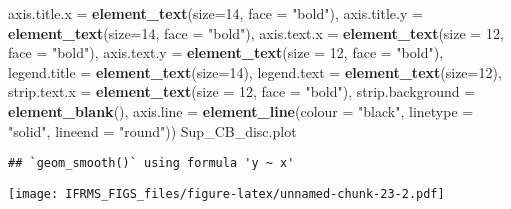 \documentclass[
]{article}
\newenvironment{Shaded}{\begin{snugshade}}{\end{snugshade}}
\newcommand{\DataTypeTok}[1]{\textcolor[rgb]{0.13,0.29,0.53}{#1}}
\newcommand{\DecValTok}[1]{\textcolor[rgb]{0.00,0.00,0.81}{#1}}
\newcommand{\KeywordTok}[1]{\textcolor[rgb]{0.13,0.29,0.53}{\textbf{#1}}}
\newcommand{\NormalTok}[1]{#1}
\newcommand{\StringTok}[1]{\textcolor[rgb]{0.31,0.60,0.02}{#1}}
\begin{document}
\begin{Shaded}
\begin{Highlighting}[]
         \DataTypeTok{axis.title.x =} \KeywordTok{element_text}\NormalTok{(}\DataTypeTok{size=}\DecValTok{14}\NormalTok{, }\DataTypeTok{face =} \StringTok{"bold"}\NormalTok{),}
         \DataTypeTok{axis.title.y =} \KeywordTok{element_text}\NormalTok{(}\DataTypeTok{size=}\DecValTok{14}\NormalTok{, }\DataTypeTok{face =} \StringTok{"bold"}\NormalTok{),}
         \DataTypeTok{axis.text.x =} \KeywordTok{element_text}\NormalTok{(}\DataTypeTok{size =} \DecValTok{12}\NormalTok{, }\DataTypeTok{face =} \StringTok{"bold"}\NormalTok{),}
         \DataTypeTok{axis.text.y =} \KeywordTok{element_text}\NormalTok{(}\DataTypeTok{size =} \DecValTok{12}\NormalTok{, }\DataTypeTok{face =} \StringTok{"bold"}\NormalTok{),}
         \DataTypeTok{legend.title =} \KeywordTok{element_text}\NormalTok{(}\DataTypeTok{size=}\DecValTok{14}\NormalTok{), }
         \DataTypeTok{legend.text =} \KeywordTok{element_text}\NormalTok{(}\DataTypeTok{size=}\DecValTok{12}\NormalTok{),}
         \DataTypeTok{strip.text.x =} \KeywordTok{element_text}\NormalTok{(}\DataTypeTok{size =} \DecValTok{12}\NormalTok{, }\DataTypeTok{face =} \StringTok{"bold"}\NormalTok{),}
         \DataTypeTok{strip.background =} \KeywordTok{element_blank}\NormalTok{(),}
         \DataTypeTok{axis.line =} \KeywordTok{element_line}\NormalTok{(}\DataTypeTok{colour =} \StringTok{"black"}\NormalTok{, }\DataTypeTok{linetype =} \StringTok{"solid"}\NormalTok{, }\DataTypeTok{lineend =} \StringTok{"round"}\NormalTok{)) }
\NormalTok{Sup_CB_disc.plot}
\end{Highlighting}
\end{Shaded}

\begin{verbatim}
## `geom_smooth()` using formula 'y ~ x'
\end{verbatim}

\texttt{[image: IFRMS\_FIGS\_files/figure-latex/unnamed-chunk-23-2.pdf]}
\end{document}
